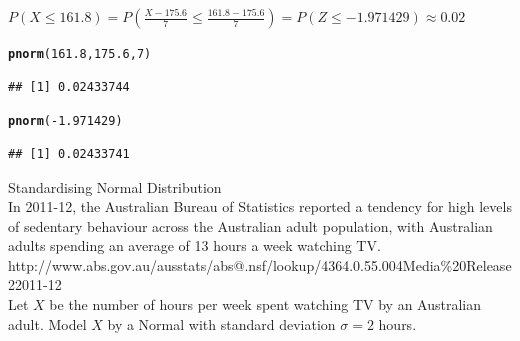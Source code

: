 \documentclass[bigtut]{tutorial}\usepackage[]{graphicx}\usepackage[]{color}
\makeatletter
\newcommand{\hlnum}[1]{\textcolor[rgb]{0.686,0.059,0.569}{#1}}%
\newcommand{\hlstr}[1]{\textcolor[rgb]{0.192,0.494,0.8}{#1}}%
\newcommand{\hlopt}[1]{\textcolor[rgb]{0,0,0}{#1}}%
\newcommand{\hlstd}[1]{\textcolor[rgb]{0.345,0.345,0.345}{#1}}%
\newcommand{\hlkwc}[1]{\textcolor[rgb]{0.333,0.667,0.333}{#1}}%
\newcommand{\hlkwd}[1]{\textcolor[rgb]{0.737,0.353,0.396}{\textbf{#1}}}%
\newenvironment{kframe}{%
 \def\at@end@of@kframe{}%
 \ifinner\ifhmode%
  \def\at@end@of@kframe{\end{minipage}}%
  \begin{minipage}{\columnwidth}%
 \fi\fi%
 \def\FrameCommand##1{\hskip\@totalleftmargin \hskip-\fboxsep
 \colorbox{shadecolor}{##1}\hskip-\fboxsep
     \hskip-\linewidth \hskip-\@totalleftmargin \hskip\columnwidth}%
 \MakeFramed {\advance\hsize-\width
   \@totalleftmargin\z@ \linewidth\hsize
   \@setminipage}}%
 {\par\unskip\endMakeFramed%
 \at@end@of@kframe}
\newenvironment{knitrout}{}{} %
\makeatother
\begin{document}
\begin{tutorial}
\begin{questions}
\begin{solution}
\begin{knitrout}
\end{knitrout}

$P(X \leq 161.8) = P(\frac{X-175.6}{7} \leq \frac{161.8-175.6}{7}) = P(Z \leq -1.971429) \approx 0.02$

\begin{knitrout}
\color{fgcolor}\begin{kframe}
\begin{alltt}
\hlkwd{pnorm}\hlstd{(}\hlnum{161.8}\hlstd{,}\hlnum{175.6}\hlstd{,}\hlnum{7}\hlstd{)}
\end{alltt}
\begin{verbatim}
## [1] 0.02433744
\end{verbatim}
\begin{alltt}
\hlkwd{pnorm}\hlstd{(}\hlopt{-}\hlnum{1.971429}\hlstd{)}
\end{alltt}
\begin{verbatim}
## [1] 0.02433741
\end{verbatim}
\end{kframe}
\end{knitrout}


\end{solution}







\question Standardising Normal Distribution \\

In 2011-12, the Australian Bureau of Statistics reported a tendency for high levels of sedentary behaviour across the Australian adult population, with Australian adults spending an average of 13 hours a week watching TV. \\
{\tiny http://www.abs.gov.au/ausstats/abs@.nsf/lookup/4364.0.55.004Media\%20Release22011-12} \\

Let $X$ be the number of hours per week spent watching TV by an Australian adult. Model $X$ by a Normal with standard deviation $\sigma = 2$ hours.  \\

\end{questions}
\end{tutorial}
\end{document}
